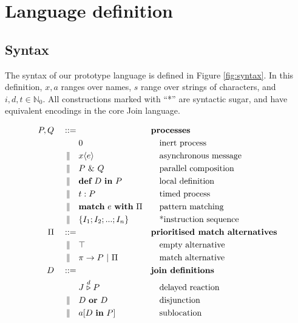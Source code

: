 \section{Language definition}

\subsection{Syntax}

The syntax of our prototype language is defined in Figure \ref{fig:syntax}. In
this definition, $x,a$ ranges over names, $s$ range over strings of characters,
and $i,d,t \in \mathbb{N}_0$. All constructions marked with ``*'' are syntactic
sugar, and have equivalent encodings in the core Join language.

\begin{figure}
\begin{align*}
P,Q\quad::={}&             && \textbf{processes} \\
          & 0              && \quad\textrm{inert process} \\
 \alt\quad& x\langle e \rangle
                           && \quad\textrm{asynchronous message} \\
 \alt\quad& P~\&~Q         && \quad\textrm{parallel composition} \\
 \alt\quad& \textbf{def}~D~\textbf{in}~P
                           && \quad\textrm{local definition} \\
 \alt\quad& t : P          && \quad\textrm{timed process} \\
 \alt\quad& \textbf{match}~e~\textbf{with}~\Pi
                           && \quad\textrm{pattern matching} \\
 \alt\quad& \{ I_1; I_2; ...; I_n \}
                           && \quad\textrm{*instruction sequence} \\
\Pi\quad ::={}&            && \textbf{prioritised match alternatives} \\
 \alt\quad& \top           && \quad\textrm{empty alternative} \\
 \alt\quad& \pi \rightarrow P ~|~ \Pi
                           && \quad\textrm{match alternative} \\
D\quad ::={}&              && \textbf{join definitions} \\
         & J \stackrel{d}{\triangleright} P
                           && \quad\textrm{delayed reaction} \\
\alt\quad& D~\textbf{or}~D && \quad\textrm{disjunction} \\
\alt\quad& a[D~\textbf{in}~P] && \quad\textrm{sublocation} \\

\end{align*}
\end{figure}
